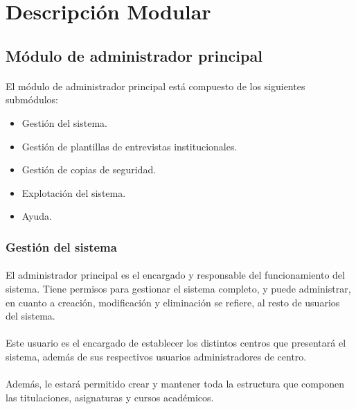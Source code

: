 \section{Descripción Modular}\label{descMod}

   \subsection{Módulo de administrador principal}

      \paragraph{}El módulo de administrador principal está compuesto de
      los siguientes submódulos:

      \begin{itemize}
       \item Gestión del sistema.
       \item Gestión de plantillas de entrevistas institucionales.
       \item Gestión de copias de seguridad.
       \item Explotación del sistema.
       \item Ayuda.
      \end{itemize}

      \subsubsection{Gestión del sistema}

      \paragraph{}El administrador principal es el encargado y responsable
      del funcionamiento del sistema. Tiene permisos para gestionar el
      sistema completo, y puede administrar, en cuanto a creación, modificación
      y eliminación se refiere, al resto de usuarios del sistema.

      \paragraph{}Este usuario es el encargado de establecer los distintos
      centros que presentará el sistema, además de sus respectivos usuarios
      administradores de centro.

      \paragraph{}Además, le estará permitido crear y mantener toda la
      estructura que componen las titulaciones, asignaturas y cursos
      académicos.

